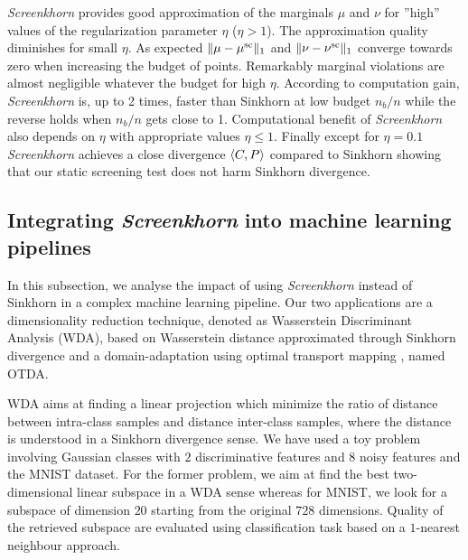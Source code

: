 %
\emph{Screenkhorn} provides good approximation of the marginals $\mu$ and $\nu$ for ''high'' values of the regularization parameter $\eta$ ($\eta > 1$). The approximation quality diminishes for small $\eta$. As expected $\|{\mu} -{\mu}^{\text{sc}}\|_1$ and $\|{\nu} -{\nu}^{\text{sc}}\|_1$ converge towards zero when increasing the budget of points. Remarkably marginal violations are almost negligible whatever the budget for high $\eta$.  According to computation gain, \emph{Screenkhorn} is, up to 2 times, faster than Sinkhorn at low budget $n_b/n$ while the reverse holds when $n_b/n$ gets close to 1.  Computational benefit of \emph{Screenkhorn} also depends on $\eta$ with appropriate values $\eta \leq 1$. Finally except for $\eta=0.1$ \emph{Screenkhorn} achieves a close divergence $\langle C, P \rangle$ compared to Sinkhorn showing that our static screening test does not harm Sinkhorn divergence.  































\subsection{Integrating \emph{Screenkhorn} into machine learning pipelines}

In this subsection, we analyse the impact of using \emph{Screenkhorn}
instead of Sinkhorn in a complex machine learning pipeline. Our two applications
are a dimensionality reduction technique, denoted as Wasserstein Discriminant Analysis (WDA), based on Wasserstein distance approximated
through Sinkhorn divergence \citep{flamary2018WDA} and a domain-adaptation using optimal transport mapping \citep{courty2017optimal}, named OTDA. 


WDA aims at finding a linear projection which minimize the ratio of distance between intra-class samples and distance inter-class samples, where the distance is understood
in a Sinkhorn divergence sense. We have used a toy problem involving Gaussian classes with $2$ discriminative features and $8$ noisy features and the MNIST dataset. For the
former problem, we aim at find the best two-dimensional linear subspace in a WDA sense whereas for MNIST, we look for a subspace of dimension $20$ starting from the original
$728$ dimensions.  Quality of the retrieved subspace are evaluated using classification task based on a $1$-nearest neighbour approach.

